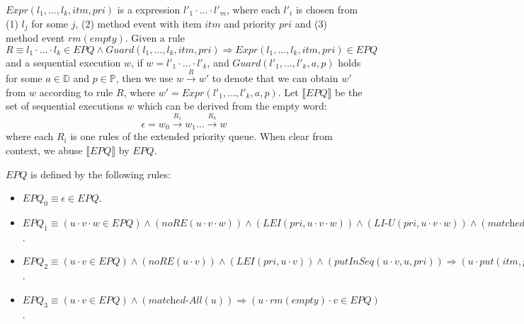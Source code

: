 $\textit{Expr}(l_1,\ldots,l_k,\textit{itm},\textit{pri})$ is a expression $l'_1 \cdot \ldots \cdot l'_m$, where each $l'_i$ is chosen from (1) $l_j$ for some $j$, (2) method event with item $\textit{itm}$ and priority $\textit{pri}$ and (3) method event $\textit{rm}(\textit{empty})$.
Given a rule $R \equiv l_1 \cdot \ldots \cdot l_k \in \textit{EPQ} \wedge \textit{Guard}(l_1,\ldots,l_k,\textit{itm},\textit{pri}) \Rightarrow \textit{Expr}(l_1,\ldots,l_k,\textit{itm},\textit{pri}) \in \textit{EPQ}$ and a sequential execution $w$, if $w=l'_1 \cdot \ldots \cdot l'_k$, and $\textit{Guard}(l'_1,\ldots,l'_k,a,p)$ holds for some $a \in \mathbb{D}$ and $p \in \mathbb{P}$, then we use $w \xrightarrow{R} w'$ to denote that we can obtain $w'$ from $w$ according to rule $R$, where $w' = \textit{Expr}(l'_1,\ldots,l'_k,a,p)$. Let $\llbracket \textit{EPQ} \rrbracket$ be the set of sequential executions $w$ which can be derived from the empty word: $$\epsilon = w_0 \xrightarrow{R_1} w_1 \ldots \xrightarrow{R_k} w$$ where each $R_i$ is one rules of the extended priority queue. When clear from context, we abuse $\llbracket \textit{EPQ} \rrbracket$ by $\textit{EPQ}$.

\begin{definition}\label{def:inductive rules of priority queue}
$\textit{EPQ}$ is defined by the following rules:
\begin{itemize}
\setlength{\itemsep}{0.5pt}
\item[-] $\textit{EPQ}_0 \equiv \epsilon \in \textit{EPQ}$.

\item[-] $\textit{EPQ}_1 \equiv (u \cdot v \cdot w \in \textit{EPQ}) \wedge
(\textit{noRE}(u \cdot v \cdot w)) \wedge
(\textit{LEI}(\textit{pri}, u \cdot v \cdot w)) \wedge
(\textit{LI-U}(\textit{pri},u \cdot v \cdot w)) \wedge
(\textit{matched-C}(u \cdot v,\textit{pri}) ) \wedge
(\textit{putInSeq}(u \cdot v \cdot w,u,\textit{pri}))
\Rightarrow
(u \cdot \textit{put}(\textit{itm},\textit{pri}) \cdot v \cdot \textit{rm}(\textit{itm}) \cdot w \in \textit{EPQ})$.

\item[-] $\textit{EPQ}_2 \equiv
(u \cdot v \in \textit{EPQ}) \wedge
(\textit{noRE}(u \cdot v)) \wedge
(\textit{LEI}(\textit{pri},u \cdot v)) \wedge
(\textit{putInSeq}(u \cdot v,u,\textit{pri}))
\Rightarrow
(u \cdot \textit{put}(\textit{itm},\textit{pri}) \cdot v \in \textit{EPQ})$.

\item[-] $\textit{EPQ}_3 \equiv
(u \cdot v \in \textit{EPQ}) \wedge
(\textit{matched-All}(u) )
\Rightarrow
(u \cdot \textit{rm}(\textit{empty}) \cdot v \in \textit{EPQ})$.
\end{itemize}
\end{definition}

